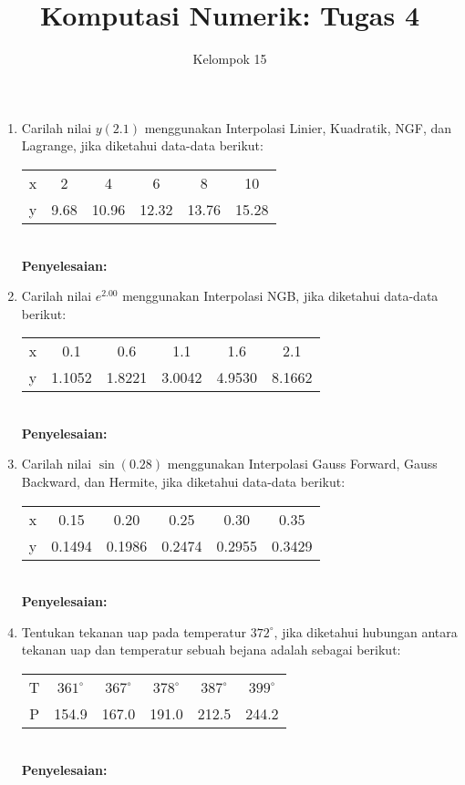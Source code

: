 \documentclass{article}
\title{\textbf{Komputasi Numerik: Tugas 4}}
\author{Kelompok 15}
\date{}
\newcommand{\penyelesaian}{\textbf{Penyelesaian: }}
\begin{document}
\maketitle

\begin{enumerate}
    \item Carilah nilai $y(\num{2,1})$ menggunakan Interpolasi Linier, Kuadratik, NGF, dan Lagrange, jika diketahui data-data berikut: \\
    \begin{tabular}{ c c c c c c }
        x & 2 & 4 & 6 & 8 & 10 \\
        y & \num{9,68} & \num{10,96} & \num{12,32} & \num{13,76} & \num{15,28} \\
    \end{tabular} \\
    \penyelesaian

    \item Carilah nilai $e^{\num{2,00}}$ menggunakan Interpolasi NGB, jika diketahui data-data berikut: \\
    \begin{tabular}{ c c c c c c }
        x & \num{0,1} & \num{0,6} & \num{1,1} & \num{1,6} & \num{2,1} \\
        y & \num{1,1052} & \num{1,8221} & \num{3,0042} & \num{4,9530} & \num{8,1662} \\
    \end{tabular} \\
    \penyelesaian 

    \item Carilah nilai $\sin(\num{0,28})$ menggunakan Interpolasi Gauss Forward, Gauss Backward, dan Hermite, jika diketahui data-data berikut: \\
    \begin{tabular}{ c c c c c c }
        x & \num{0,15} & \num{0,20} & \num{0,25} & \num{0,30} & \num{0,35} \\
        y & \num{0,1494} & \num{0,1986} & \num{0,2474} & \num{0,2955} & \num{0,3429} \\
    \end{tabular} \\
    \penyelesaian

    \item Tentukan tekanan uap pada temperatur $372^{\circ}$, jika diketahui hubungan antara tekanan uap dan temperatur sebuah bejana adalah sebagai berikut: \\
        \begin{tabular}{ c c c c c c }
        T & $361^{\circ}$ & $367^{\circ}$ & $378^{\circ}$ & $387^{\circ}$ & $399^{\circ}$ \\
        P & \num{154,9} & \num{167,0} & \num{191,0} & \num{212,5} & \num{244,2} \\
    \end{tabular} \\
    \penyelesaian


\end{enumerate}
\end{document}

